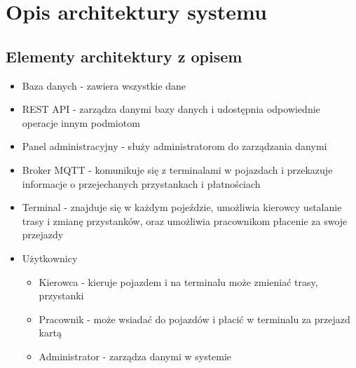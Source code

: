 \section{Opis architektury systemu}
\subsection{Elementy architektury z opisem}
\begin{itemize}
  \item{Baza danych - zawiera wszystkie dane}
  \item{REST API - zarządza danymi bazy danych i udostępnia odpowiednie operacje innym podmiotom}
  \item{Panel administracyjny - służy administratorom do zarządzania danymi}
  \item{Broker MQTT - komunikuje się z terminalami w pojazdach i przekazuje informacje o przejechanych przystankach i płatnościach}
  \item{Terminal - znajduje się w każdym pojeździe, umożliwia kierowcy ustalanie trasy i zmianę przystanków, oraz umożliwia pracownikom płacenie za swoje przejazdy}
  \item{
    Użytkownicy
    \begin{itemize}
      \item{Kierowca - kieruje pojazdem i na terminalu może zmieniać trasy, przystanki}
      \item{Pracownik - może wsiadać do pojazdów i płacić w terminalu za przejazd kartą}
      \item{Administrator - zarządza danymi w systemie}
    \end{itemize}
  }
\end{itemize}
